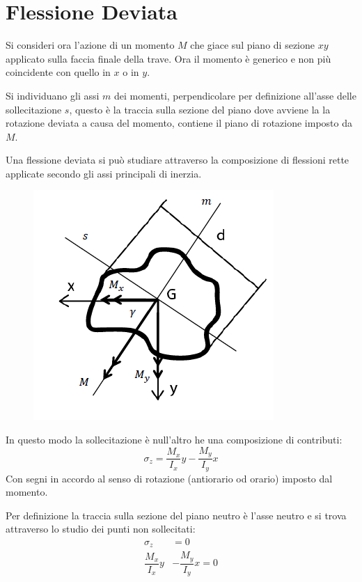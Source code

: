 	\section{Flessione Deviata}
		Si consideri ora l’azione di un momento $ M $ che giace sul piano di
		sezione $ xy $ applicato sulla faccia finale della trave. Ora il momento è generico e non più coincidente con quello in $x$ o in $y$. 
		
		Si individuano gli assi $m$ dei momenti, perpendicolare per definizione all'asse delle sollecitazione $s$, questo è la traccia sulla sezione del piano dove avviene la la rotazione deviata a causa del momento, contiene il piano di rotazione imposto da $M$. \newline 
		
		Una flessione deviata si può studiare attraverso la composizione di flessioni rette applicate secondo gli assi principali di inerzia.
		
\begin{figure}[H]
	\centering
	\label{fig:screenshot001}
	\includegraphics[width=0.5\linewidth]{immagini_4/screenshot001}
\end{figure}

		In questo modo la sollecitazione è null'altro he una composizione di contributi: 
		\begin{equation} \label{eq:1}
			\sigma_z = \dfrac{M_x}{I_x}y - \dfrac{M_y}{I_y}x
		\end{equation}
		Con segni in accordo al senso di rotazione (antiorario od orario) imposto dal momento. \newline 
		
		Per definizione la traccia sulla sezione del piano neutro è l'asse neutro e si trova attraverso lo studio dei punti non sollecitati:
		\[ \begin{aligned}
			\sigma_z &= 0 \\
			\dfrac{M_x}{I_x}y &- \dfrac{M_y}{I_y}x =0
		\end{aligned} \]
				
